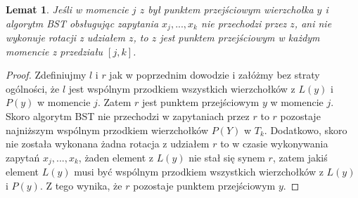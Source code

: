 \documentclass[declaration,shortabstract]{iithesis}
\newcounter{thm}[section]
\theoremstyle{thm}
\theoremstyle{remark}
\theoremstyle{plain}
\theoremstyle{plain}
\theoremstyle{plain}
\newtheorem{lemma}[thm]{Lemat}
\begin{document}
\begin{lemma} 
Jeśli w momencie $j$ $z$ był punktem przejściowym wierzchołka $y$ i algorytm BST obsługując zapytania $x_j, ..., x_k$  nie przechodzi przez $z$, ani nie wykonuje rotacji z udziałem $z$, to $z$ jest punktem przejściowym w każdym momencie z przedziału \([j, k]\). 
\end{lemma}
\begin{proof} Zdefiniujmy $l$ i $r$ jak w poprzednim dowodzie i załóżmy bez straty ogólności, że $l$ jest wspólnym przodkiem wszystkich wierzchołków z $L(y)$ i $P(y)$ w momencie $j$. Zatem $r$ jest punktem przejściowym $y$ w momencie $j$. Skoro algorytm BST nie przechodzi w zapytaniach przez $r$ to $r$ pozostaje najniższym wspólnym przodkiem wierzchołków $P(Y)$ w $T_k$. Dodatkowo, skoro nie została wykonana żadna rotacja z udziałem $r$ to w czasie wykonywania zapytań \( x_j,..., x_k\), żaden element z $L(y)$ nie stał się synem $r$, zatem jakiś element $L(y)$ musi być wspólnym przodkiem wszystkich wierzchołków z $L(y)$ i $P(y)$. Z tego wynika, że $r$ pozostaje punktem przejściowym $y$. 
\end{proof}  
\end{document}
